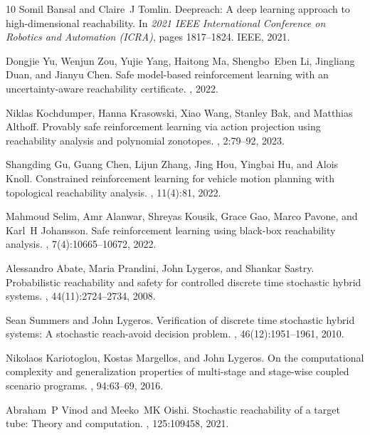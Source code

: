 \documentclass{article}
\theoremstyle{definition}
\begin{document}
\begin{thebibliography}{10}
Somil Bansal and Claire~J Tomlin.
\newblock Deepreach: A deep learning approach to high-dimensional reachability.
\newblock In {\em 2021 IEEE International Conference on Robotics and Automation (ICRA)}, pages 1817--1824. IEEE, 2021.

Dongjie Yu, Wenjun Zou, Yujie Yang, Haitong Ma, Shengbo~Eben Li, Jingliang Duan, and Jianyu Chen.
\newblock Safe model-based reinforcement learning with an uncertainty-aware reachability certificate.
, 2022.

Niklas Kochdumper, Hanna Krasowski, Xiao Wang, Stanley Bak, and Matthias Althoff.
\newblock Provably safe reinforcement learning via action projection using reachability analysis and polynomial zonotopes.
, 2:79--92, 2023.

Shangding Gu, Guang Chen, Lijun Zhang, Jing Hou, Yingbai Hu, and Alois Knoll.
\newblock Constrained reinforcement learning for vehicle motion planning with topological reachability analysis.
, 11(4):81, 2022.

Mahmoud Selim, Amr Alanwar, Shreyas Kousik, Grace Gao, Marco Pavone, and Karl~H Johansson.
\newblock Safe reinforcement learning using black-box reachability analysis.
, 7(4):10665--10672, 2022.

Alessandro Abate, Maria Prandini, John Lygeros, and Shankar Sastry.
\newblock Probabilistic reachability and safety for controlled discrete time stochastic hybrid systems.
, 44(11):2724--2734, 2008.

Sean Summers and John Lygeros.
\newblock Verification of discrete time stochastic hybrid systems: A stochastic reach-avoid decision problem.
, 46(12):1951--1961, 2010.

Nikolaos Kariotoglou, Kostas Margellos, and John Lygeros.
\newblock On the computational complexity and generalization properties of multi-stage and stage-wise coupled scenario programs.
, 94:63--69, 2016.

Abraham~P Vinod and Meeko~MK Oishi.
\newblock Stochastic reachability of a target tube: Theory and computation.
, 125:109458, 2021.


\end{thebibliography}
\end{document}
